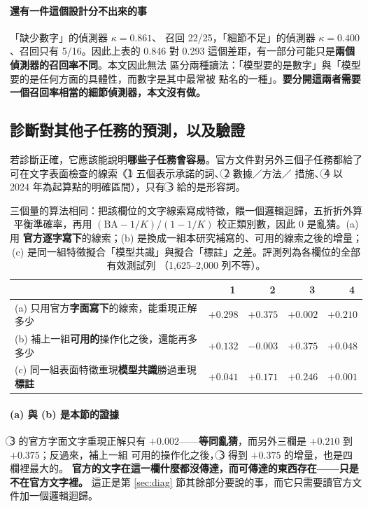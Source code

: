\documentclass[11pt,a4paper]{ctexart}
\begin{document}
\paragraph{還有一件這個設計分不出來的事} 「缺少數字」的偵測器 $\kappa = 0.861$、
召回 22/25，「細節不足」的偵測器 $\kappa = 0.400$、召回只有 5/16。因此上表的 0.846
對 0.293 這個差距，有一部分可能只是\textbf{兩個偵測器的召回率不同}。本文因此無法
區分兩種讀法：「模型要的是數字」與「模型要的是任何方面的具體性，而數字是其中最常被
點名的一種」。\textbf{要分開這兩者需要一個召回率相當的細節偵測器，本文沒有做。}

\subsection{診斷對其他子任務的預測，以及驗證}

若診斷正確，它應該能說明\textbf{哪些子任務會容易}。官方文件對另外三個子任務都給了
可在文字表面檢查的線索（\textcircled{1} 五個表示承諾的詞、\textcircled{2} 數據／方法／
措施、\textcircled{4} 以 2024 年為起算點的明確區間），只有 \textcircled{3} 給的是形容詞。

\begin{table}[h]
\centering\small
\begin{tabular}{@{}p{7.2cm}rrrr@{}}
\toprule
 & \textcircled{1} & \textcircled{2} & \textcircled{3} & \textcircled{4} \\
\midrule
(a) 只用官方\textbf{字面寫下}的線索，能重現正解多少 & $+0.298$ & $+0.375$ & $\mathbf{+0.002}$ & $+0.210$ \\
(b) 補上一組\textbf{可用的}操作化之後，還能再多多少 & $+0.132$ & $-0.003$ & $\mathbf{+0.375}$ & $+0.048$ \\
\midrule
(c) 同一組表面特徵重現\textbf{模型共識}勝過重現\textbf{標註} & $+0.041$ & $+0.171$ & $+0.246$ & $+0.001$ \\
\bottomrule
\end{tabular}
\caption{三個量的算法相同：把該欄位的文字線索寫成特徵，餵一個邏輯迴歸，五折折外算
平衡準確率，再用 $(\text{BA} - 1/K)/(1 - 1/K)$ 校正類別數，因此 0 是亂猜。(a) 用
\textbf{官方逐字寫下}的線索；(b) 是換成一組本研究補寫的、可用的線索之後的增量；
(c) 是同一組特徵擬合「模型共識」與擬合「標註」之差。評測列為各欄位的全部有效測試列
（1{,}625--2{,}000 列不等）。}
\end{table}

\paragraph{(a) 與 (b) 是本節的證據} \textcircled{3} 的官方字面文字重現正解只有
$+0.002$——\textbf{等同亂猜}，而另外三欄是 $+0.210$ 到 $+0.375$；反過來，補上一組
可用的操作化之後，\textcircled{3} 得到 $+0.375$ 的增量，也是四欄裡最大的。
\textbf{官方的文字在這一欄什麼都沒傳達，而可傳達的東西存在——只是不在官方文字裡。}
這正是第 \ref{sec:diag} 節其餘部分要說的事，而它只需要讀官方文件加一個邏輯迴歸。
\end{document}
